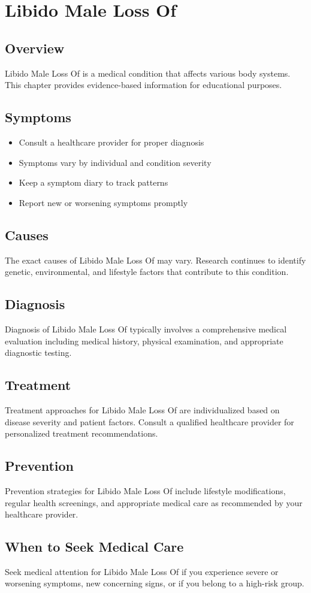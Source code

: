 \chapter{Libido Male Loss Of}

\section*{Overview}
Libido Male Loss Of is a medical condition that affects various body systems. This chapter provides evidence-based information for educational purposes.

\section*{Symptoms}
\begin{itemize}
  \item Consult a healthcare provider for proper diagnosis
  \item Symptoms vary by individual and condition severity
  \item Keep a symptom diary to track patterns
  \item Report new or worsening symptoms promptly
\end{itemize}

\section*{Causes}
The exact causes of Libido Male Loss Of may vary. Research continues to identify genetic, environmental, and lifestyle factors that contribute to this condition.

\section*{Diagnosis}
Diagnosis of Libido Male Loss Of typically involves a comprehensive medical evaluation including medical history, physical examination, and appropriate diagnostic testing.

\section*{Treatment}
Treatment approaches for Libido Male Loss Of are individualized based on disease severity and patient factors. Consult a qualified healthcare provider for personalized treatment recommendations.

\section*{Prevention}
Prevention strategies for Libido Male Loss Of include lifestyle modifications, regular health screenings, and appropriate medical care as recommended by your healthcare provider.

\section*{When to Seek Medical Care}
Seek medical attention for Libido Male Loss Of if you experience severe or worsening symptoms, new concerning signs, or if you belong to a high-risk group.
\clearpage
